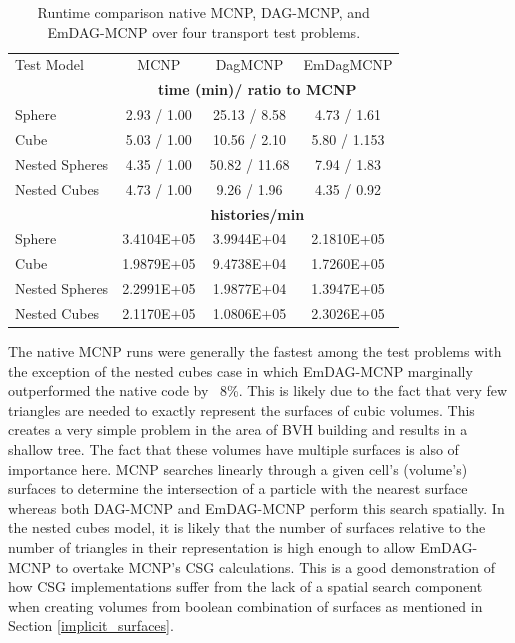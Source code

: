 \documentclass[12pt, a4paper]{article}
\begin{document}
\begin{table}[H]
  \small
  \begin{center}

      \label{timings}
    \begin{tabular}{lccc}

      \toprule
      Test Model & MCNP & DagMCNP & EmDagMCNP \\
      & \multicolumn{3}{c}{\textbf{time (min)/ ratio to MCNP}} \\
      \hline
      Sphere & 2.93 / 1.00 & 25.13 / 8.58  & 4.73 / 1.61  \\
      Cube & 5.03 / 1.00 & 10.56 / 2.10 & 5.80 / 1.153 \\
      Nested Spheres & 4.35 / 1.00  & 50.82 / 11.68  & 7.94 / 1.83 \\
      Nested Cubes & 4.73 / 1.00 & 9.26 / 1.96 & 4.35 / 0.92 \\
      &  \multicolumn{3}{c}{\textbf{histories/min}} \\
      \hline
      Sphere & 3.4104E+05  & 3.9944E+04  & 2.1810E+05   \\
      Cube & 1.9879E+05 & 9.4738E+04 & 1.7260E+05 \\
      Nested Spheres & 2.2991E+05 & 1.9877E+04 & 1.3947E+05 \\
      Nested Cubes & 2.1170E+05 & 1.0806E+05 & 2.3026E+05 \\
      \bottomrule
      
    \end{tabular}
  \end{center}
  \caption{Runtime comparison native MCNP, DAG-MCNP, and EmDAG-MCNP over four transport test problems.}
  
\end{table}

The native MCNP runs were generally the fastest among the test problems with the exception of the nested cubes case in which EmDAG-MCNP marginally outperformed the native code by ~8\%. This is likely due to the fact that very few triangles are needed to exactly represent the surfaces of cubic volumes. This creates a very simple problem in the area of BVH building and results in a shallow tree. The fact that these volumes have multiple surfaces is also of importance here. MCNP searches linearly through a given cell's (volume's) surfaces to determine the intersection of a particle with the nearest surface whereas both DAG-MCNP and EmDAG-MCNP perform this search spatially. In the nested cubes model, it is likely that the number of surfaces relative to the number of triangles in their representation is high enough to allow EmDAG-MCNP to overtake MCNP's CSG calculations. This is a good demonstration of how CSG implementations suffer from the lack of a spatial search component when creating volumes from boolean combination of surfaces as mentioned in Section \ref{implicit_surfaces}.
\end{document}
